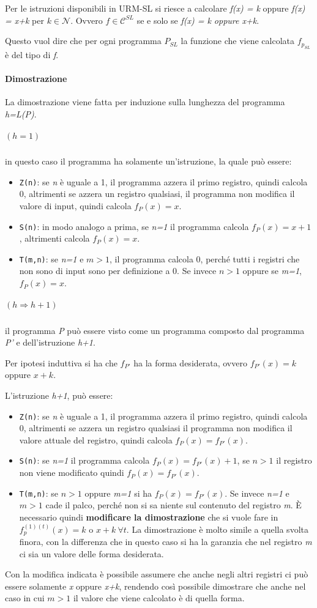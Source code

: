 Per le istruzioni disponibili in URM-SL si riesce a calcolare \emph{f(x) = k} oppure \emph{f(x) = x+k} per $k \in \mathcal{N}$. 
Ovvero $f \in \mathcal{C}^{SL}$ se e solo se \emph{f(x) = k oppure x+k}.

Questo vuol dire che per ogni programma $P_{SL}$ la funzione che viene calcolata $f_{p_{SL}}$ è del tipo di \emph{f}.

\paragraph{Dimostrazione}

La dimostrazione viene fatta per induzione sulla lunghezza del programma \textit{h=L(P)}.

\subparagraph{$(h = 1)$} in questo caso il programma ha solamente un'istruzione, la quale può essere:

\begin{itemize}
	\item
	\texttt{Z(n)}: se \emph{n} è uguale a 1, il programma azzera il primo
	registro, quindi calcola 0, altrimenti se azzera un registro
	qualsiasi, il programma non modifica il valore di input, quindi
	calcola $f_P(x) = x$.
	\item
	\texttt{S(n)}: in modo analogo a prima, se \emph{n=1} il programma
	calcola $f_P(x) = x+1$, altrimenti calcola $f_P(x) = x$.
	\item
	\texttt{T(m,n)}: se \emph{n=1} e $m >1$, il programma
	calcola 0, perché tutti i registri che non sono di input sono per
	definizione a 0. Se invece $n >1$ oppure se
	\emph{m=1}, $f_P(x)= x$.
\end{itemize}

\subparagraph{$(h \Rightarrow h+1)$}

il programma \emph{P} può essere visto come un programma composto dal programma \textit{P'} e dell'istruzione \textit{h+1}. 

Per ipotesi induttiva si ha che $f_{P'}$ ha la forma desiderata, ovvero $f_{P'}(x) = k$ oppure $x+k$.

L'istruzione \emph{h+1}, può essere:

\begin{itemize}
	\item
	\texttt{Z(n)}: se \emph{n} è uguale a 1, il programma azzera il primo
	registro, quindi calcola 0, altrimenti se azzera un registro
	qualsiasi il programma non modifica il valore attuale del registro,
	quindi calcola $f_P(x) = f_{P'}(x)$.
	\item
	\texttt{S(n)}: se \emph{n=1} il programma calcola $f_P(x) = f_{P'}(x)+1$, se $n >1$ il registro non viene
	modificato quindi $f_P(x) = f_{P'}(x)$.
	\item
	\texttt{T(m,n)}: se $n>1$ oppure \emph{m=1} si ha
	$f_{P}(x) = f_{P'}(x)$. Se invece \emph{n=1} e $m > 1$ cade il palco, perché non si sa niente sul contenuto
	del registro \emph{m}. 
	È necessario quindi \textbf{modificare la dimostrazione} che si vuole fare in $f_{p}^{(1)(t)}(x) = k \text{ o } x+k \:\forall t$. La
	dimostrazione è molto simile a quella svolta finora, con la differenza
	che in questo caso si ha la garanzia che nel registro \emph{m} ci sia
	un valore delle forma desiderata.
\end{itemize}

Con la modifica indicata è possibile assumere che anche negli altri registri ci può essere solamente \textit{x} oppure \textit{x+k}, rendendo così possibile dimostrare che anche nel caso in cui $m>1$ il valore che viene calcolato è di quella forma.